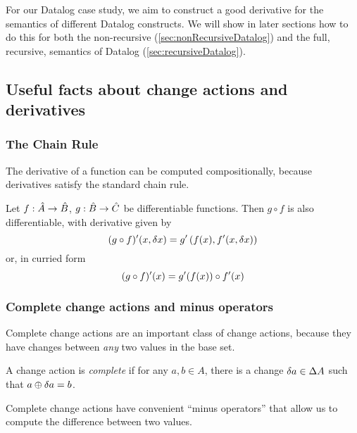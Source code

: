 
For our Datalog case study, we aim to construct a good derivative for the semantics of
different Datalog constructs. We will show in later sections how to do this for both the
non-recursive (\cref{sec:nonRecursiveDatalog}) and the full, recursive, semantics of Datalog
(\cref{sec:recursiveDatalog}).

\subsection{Useful facts about change actions and derivatives}

\subsubsection{The Chain Rule}

The derivative of a function can be computed compositionally, because derivatives satisfy the standard chain rule.

\begin{thm}
  Let $f: \hat{A} \rightarrow \hat{B}$, $g: \hat{B} \rightarrow \hat{C}$ be differentiable functions. Then $g \circ f$ is also
  differentiable, with derivative given by
  \begin{displaymath}
    (g \circ f)'(x, \delta x) = g'\left(f(x), f'(x, \delta x)\right)
  \end{displaymath}
  or, in curried form
  \begin{displaymath}
    (g \circ f)'(x) = g'(f(x)) \circ f'(x)
  \end{displaymath}
\end{thm}

\subsubsection{Complete change actions and minus operators}

Complete change actions are an important class of change actions, because they
have changes between \emph{any} two values in the base set.

\begin{defn}
  A change action is \emph{complete} if for any $a, b \in A$, there is
  a change $\delta a \in \Delta A$ such that $a \oplus \delta a = b$.
\end{defn}

Complete change actions have convenient ``minus operators'' that allow us to
compute the difference between two values.

